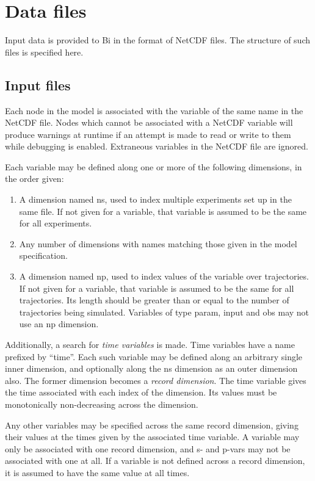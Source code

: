 \section{Data files\label{Data_files}}

Input data is provided to Bi in the format of NetCDF files. The
structure of such files is specified here.

\subsection{Input files}

Each node in the model is associated with the variable of the same name in the
NetCDF file. Nodes which cannot be associated with a NetCDF variable will
produce warnings at runtime if an attempt is made to read or write to them
while debugging is enabled. Extraneous variables in the NetCDF file are
ignored.

Each variable may be defined along one or more of the following dimensions, in
the order given:
\begin{enumerate}
\item A dimension named \textsf{ns}, used to index multiple experiments set up
  in the same file. If not given for a variable, that variable is assumed to
  be the same for all experiments.
\item Any number of dimensions with names matching those given in the model
  specification.
\item A dimension named \textsf{np}, used to index values of the variable over
  trajectories. If not given for a variable, that variable is assumed to be
  the same for all trajectories. Its length should be greater than or equal to
  the number of trajectories being simulated. Variables of type
  \textsf{param}, \textsf{input} and \textsf{obs} may not use an \textsf{np}
  dimension.
\end{enumerate}

Additionally, a search for \emph{time variables} is
made. Time variables have a name prefixed by ``time''. Each such variable may
be defined along an arbitrary single inner dimension, and optionally along the
\textsf{ns} dimension as an outer dimension also. The former dimension becomes
a \emph{record dimension}. The time variable gives the
time associated with each index of the dimension. Its values must be
monotonically non-decreasing across the dimension.

Any other variables may be specified across the same record dimension,
giving their values at the times given by the associated time variable.
A variable may only be associated with one record dimension, and s- and
p-vars may not be associated with one at all. If a variable is not defined
across a record dimension, it is assumed to have the same value at all
times.

